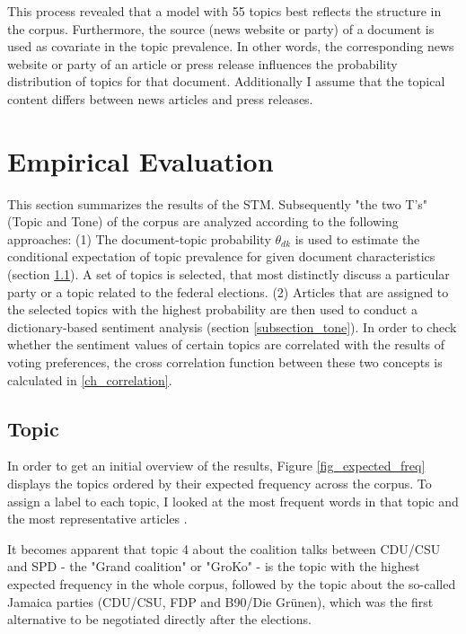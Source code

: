 \documentclass[12pt,a4paper,notitlepage]{article}
\begin{document}
This process revealed that a model with 55 topics best reflects the structure in the corpus. Furthermore, the source (news website or party) of a document is used as covariate in the topic prevalence. In other words, the corresponding news website or party of an article or press release influences the probability distribution of topics for that document. Additionally I assume that the topical content differs between news articles and press releases. 


\section{Empirical Evaluation}\label{ch_empirical}

This section summarizes the results of the STM. Subsequently "the two T's" (Topic and Tone) of the corpus are analyzed according to the following approaches: (1) The document-topic probability $\theta_{dk}$ is used to estimate the conditional expectation of topic prevalence for given document characteristics (section \ref{subsection_topic}). A set of topics is selected, that most distinctly discuss a particular party or a topic related to the federal elections. (2) Articles that are assigned to the selected topics with the highest probability are then used to conduct a dictionary-based sentiment analysis (section \ref{subsection_tone}). In order to check whether the sentiment values of certain topics are correlated with the results of voting preferences, the cross correlation function between these two concepts is calculated in \ref{ch_correlation}.

\subsection{Topic}\label{subsection_topic}

In order to get an initial overview of the results, Figure \ref{fig_expected_freq} displays the topics ordered by their expected frequency across the corpus. To assign a label to each topic, I looked at the most frequent words in that topic and the most representative articles \citep{roberts_model_2016}. 

It becomes apparent that topic 4 about the coalition talks between CDU/CSU and SPD - the "Grand coalition" or "GroKo" - is the topic with the highest expected frequency in the whole corpus, followed by the topic about the so-called Jamaica parties (CDU/CSU, FDP and B90/Die Grünen), which was the first alternative to be negotiated directly after the elections.  
\end{document}
